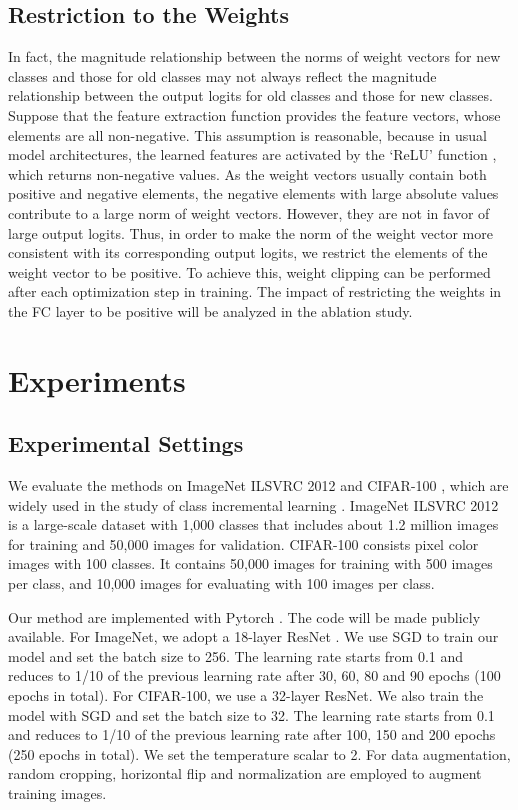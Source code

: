 \documentclass[10pt,twocolumn,letterpaper]{article}
\begin{document}
\subsection{Restriction to the Weights}\label{sec:r_to_w}
In fact, the magnitude relationship between the norms of weight vectors for new classes and those for old classes may not always reflect the magnitude relationship between the output logits for old classes and those for new classes. Suppose that the feature extraction function provides the feature vectors, whose elements are all non-negative. This assumption is reasonable, because in usual model architectures, the learned features are activated by the `ReLU' function , which returns non-negative values. As the weight vectors  usually contain both positive and negative elements, the negative elements with large absolute values contribute to a large norm of weight vectors. However, they are not in favor of large output logits. 
Thus, in order to make the norm of the weight vector  more consistent with its corresponding output logits, we restrict the elements of the weight vector  to be positive. To achieve this, weight clipping \cite{Arjovsky2017WassersteinG} can be performed after each optimization step in training. The impact of restricting the weights in the FC layer to be positive will be analyzed in the ablation study.


\section{Experiments}\label{sec:experiment}

\subsection{Experimental Settings}
We evaluate the methods on ImageNet ILSVRC 2012 \cite{Russakovsky2015} and CIFAR-100 \cite{Krizhevsky09}, which are widely used in the study of class incremental learning \cite{castro2018end,rebuffi2017icarl,wu2019large}. ImageNet ILSVRC 2012 is a large-scale dataset with 1,000 classes that includes about 1.2 million images for training and 50,000 images for validation. CIFAR-100 consists  pixel color images with 100 classes. It contains 50,000 images for training with 500 images per class, and 10,000 images for evaluating with 100 images per class.

Our method are implemented with Pytorch \cite{paszke2017automatic}. The code will be made publicly available. For ImageNet, we adopt a 18-layer ResNet \cite{He2015DeepRL,He2016IdentityMI}. We use SGD to train our model and set the batch size to 256. The learning rate starts from 0.1 and reduces to 1/10 of the previous learning rate after 30, 60, 80 and 90 epochs (100 epochs in total). For CIFAR-100, we use a 32-layer ResNet. We also train the model with SGD and set the batch size to 32. The learning rate starts from 0.1 and reduces to 1/10 of the previous learning rate after 100, 150 and 200 epochs (250 epochs in total). We set the temperature scalar  to 2. For data augmentation, random cropping, horizontal flip and normalization are employed to augment training images. 
\end{document}
